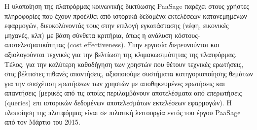 \begin{titlepage}
Η υλοποίηση της πλατφόρμας κοινωνικής δικτύωσης PaaSage παρέχει στους χρήστες πληροφορίες που έχουν προέλθει από ιστορικά δεδομένα εκτελέσεων κατανεμημένων εφαρμογών, διευκολύνοντάς τους στην επιλογή εγκατάστασης (νέφη, εικονικές μηχανές, κλπ) με βάση σύνθετα κριτήρια, όπως η ανάλυση κόστους-αποτελεσματικότητας (cost effectiveness).  Στην εργασία διερευνούνται και αξιολογούνται τεχνικές για την βελτίωση της κλιμακωσιμότητας της πλατφόρμας. Τέλος, για την καλύτερη καθοδήγηση των χρηστών που θέτουν τεχνικές ερωτήσεις, στις βέλτιστες πιθανές απαντήσεις, αξιοποιούμε συστήματα κατηγοριοποίησης θεμάτων για την συσχέτιση ερωτήσεων των χρηστών με αποθηκευμένες ερωτήσεις και απαντήσεις (μερικές από τις οποίες περιλαμβάνουν αποτελέσματα από επερωτήσεις (queries) επι ιστορικών δεδομένων αποτελεσμάτων εκτελέσεων εφαρμογών). Η υλοποίηση της πλατφόρμας είναι σε πιλοτική λειτουργία εντός του έργου PaaSage από τον Μάρτιο του 2015.



\vfill

\end{titlepage}

